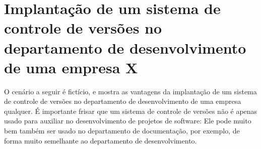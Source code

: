 \section{Implantação de um sistema de controle de versões no departamento de desenvolvimento de uma empresa X}

O cenário a seguir é fictício, e mostra as vantagens da implantação de um sistema de controle de versões no departamento de desenvolvimento de uma empresa qualquer.
É importante frisar que um sistema de controle de versões não é apenas usado para auxiliar no desenvolvimento de projetos de software: Ele pode muito bem também ser usado no departamento de documentação, por exemplo, de forma muito semelhante ao departamento de desenvolvimento.


